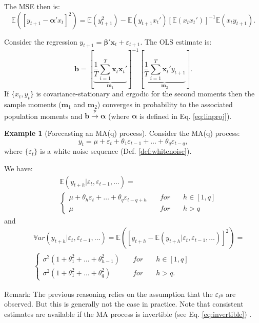 \documentclass[
  12pt,
]{book}
\theoremstyle{definition}
\theoremstyle{definition}
\newtheorem{example}{Example}[chapter]
\theoremstyle{definition}
\theoremstyle{definition}
\theoremstyle{remark}
\begin{document}
The MSE then is:
\[
\mathbb{E}([y_{t+1} - \boldsymbol\alpha'x_t]^2) = \mathbb{E}{(y_{t+1}^2)} - \mathbb{E}\left( y_{t+1}x_t' \right)[\mathbb{E}\left(x_tx_t' \right)]^{-1}\mathbb{E}\left(x_ty_{t+1} \right).
\]

Consider the regression \(y_{t+1} = \boldsymbol\beta'\mathbf{x}_t + \varepsilon_{t+1}\). The OLS estimate is:
\[
\mathbf{b} = \left[ \underbrace{ \frac{1}{T} \sum_{i=1}^T \mathbf{x}_t\mathbf{x}_t'}_{\mathbf{m}_1} \right]^{-1}\left[  \underbrace{ \frac{1}{T} \sum_{i=1}^T \mathbf{x}_t'y_{t+1}}_{\mathbf{m}_2} \right].
\]
If \(\{x_t,y_t\}\) is covariance-stationary and ergodic for the second moments then the sample moments (\(\mathbf{m}_1\) and \(\mathbf{m}_2\)) converges in probability to the associated population moments and \(\mathbf{b} \overset{p}{\rightarrow} \boldsymbol\alpha\) (where \(\boldsymbol\alpha\) is defined in Eq. \eqref{eq:linproj}).

\begin{example}[Forecasting an MA(q) process]
\protect\hypertarget{exm:fcstMAq}{}\label{exm:fcstMAq}Consider the MA(q) process:
\[
y_t = \mu + \varepsilon_t + \theta_1 \varepsilon_{t-1} + \dots + \theta_q \varepsilon_{t-q},
\]
where \(\{\varepsilon_t\}\) is a white noise sequence (Def. \ref{def:whitenoise}).

We have:
\begin{eqnarray*}
&&\mathbb{E}(y_{t+h}|\varepsilon_{t},\varepsilon_{t-1},\dots) =\\
&&\left\{
\begin{array}{lll}
\mu + \theta_h \varepsilon_{t} + \dots + \theta_q \varepsilon_{t-q+h}  \quad &for& \quad h \in [1,q]\\
\mu \quad &for& \quad h > q
\end{array}
\right.
\end{eqnarray*}
and
\begin{eqnarray*}
&&\mathbb{V}ar(y_{t+h}|\varepsilon_{t},\varepsilon_{t-1},\dots)= \mathbb{E}\left( [y_{t+h} - \mathbb{E}(y_{t+h}|\varepsilon_{t},\varepsilon_{t-1},\dots)]^2 \right) =\\
&&\left\{
\begin{array}{lll}
\sigma^2(1+\theta_1^2+\dots+\theta_{h-1}^2) \quad &for& \quad h \in [1,q]\\
\sigma^2(1+\theta_1^2+\dots+\theta_q^2) \quad &for& \quad h>q.
\end{array}
\right.
\end{eqnarray*}

Remark: The previous reasoning relies on the assumption that the \(\varepsilon_t\)s are observed. But this is generally not the case in practice. Note that consistent estimates are available if the MA process is invertible (see Eq. \eqref{eq:invertible}) .
\end{example}
\end{document}
